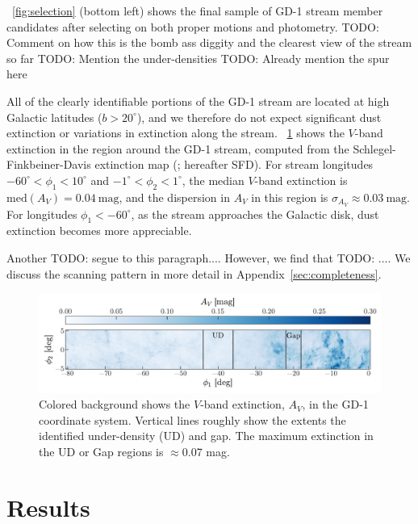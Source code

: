 \documentclass[modern]{aastex62}
\newcommand{\mag}{\textrm{mag}}
\newcommand{\todo}[1]{{\color{red} TODO: #1}}
\begin{document}
\figurename~\ref{fig:selection} (bottom left) shows the final sample of GD-1
stream member candidates after selecting on both proper motions and photometry.
\todo{Comment on how this is the bomb ass diggity and the clearest view of the
stream so far}
\todo{Mention the under-densities}
\todo{Already mention the spur here}

All of the clearly identifiable portions of the GD-1 stream are located at high
Galactic latitudes ($b > 20^\circ$), and we therefore do not expect significant
dust extinction or variations in extinction along the stream.
\figurename~\ref{fig:sfd} shows the $V$-band extinction in the region around the
GD-1 stream, computed from the Schlegel-Finkbeiner-Davis extinction map
(\cite{Schlegel:1998}; hereafter SFD).
For stream longitudes $-60^\circ < \phi_1 < 10^\circ$ and $-1^\circ < \phi_2 <
1^\circ$, the median $V$-band extinction is $\textrm{med}\left(A_V\right) =
0.04~\mag$, and the dispersion in $A_V$ in this region is $\sigma_{A_V} \approx
0.03~\textrm{mag}$.
For longitudes $\phi_1 < -60^\circ$, as the stream approaches the Galactic disk,
dust extinction becomes more appreciable.

Another \todo{segue to this paragraph...}.
However, we find that \todo{...}.
We discuss the scanning pattern in more detail in
Appendix~\ref{sec:completeness}.

\begin{figure}[h]
\begin{center}
\includegraphics[width=\textwidth]{sfd.pdf}
\end{center}
\caption{%
Colored background shows the $V$-band extinction, $A_V$, in the GD-1
coordinate system.
Vertical lines roughly show the extents the identified under-density (UD) and
gap.
The maximum extinction in the UD or Gap regions is $\approx$0.07 mag.
\label{fig:sfd}
}
\end{figure}


\section{Results}
\label{sec:results}
\end{document}
